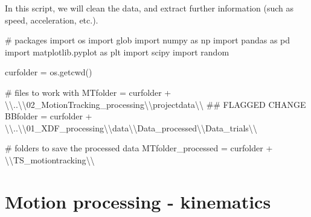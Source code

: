 \documentclass[
  letterpaper,
  DIV=11,
  numbers=noendperiod]{scrreprt}
\newenvironment{Shaded}{\begin{snugshade}}{\end{snugshade}}
\newcommand{\CharTok}[1]{\textcolor[rgb]{0.13,0.47,0.30}{#1}}
\newcommand{\CommentTok}[1]{\textcolor[rgb]{0.37,0.37,0.37}{#1}}
\newcommand{\ImportTok}[1]{\textcolor[rgb]{0.00,0.46,0.62}{#1}}
\newcommand{\NormalTok}[1]{\textcolor[rgb]{0.00,0.23,0.31}{#1}}
\newcommand{\OperatorTok}[1]{\textcolor[rgb]{0.37,0.37,0.37}{#1}}
\newcommand{\StringTok}[1]{\textcolor[rgb]{0.13,0.47,0.30}{#1}}
\begin{document}
In this script, we will clean the data, and extract further information
(such as speed, acceleration, etc.).

\begin{Shaded}
\begin{Highlighting}[]
\CommentTok{\# packages}
\ImportTok{import}\NormalTok{ os}
\ImportTok{import}\NormalTok{ glob}
\ImportTok{import}\NormalTok{ numpy }\ImportTok{as}\NormalTok{ np}
\ImportTok{import}\NormalTok{ pandas }\ImportTok{as}\NormalTok{ pd}
\ImportTok{import}\NormalTok{ matplotlib.pyplot }\ImportTok{as}\NormalTok{ plt}
\ImportTok{import}\NormalTok{ scipy}
\ImportTok{import}\NormalTok{ random}



\NormalTok{curfolder }\OperatorTok{=}\NormalTok{ os.getcwd()}

\CommentTok{\# files to work with}
\NormalTok{MTfolder }\OperatorTok{=}\NormalTok{ curfolder }\OperatorTok{+} \StringTok{\textquotesingle{}}\CharTok{\textbackslash{}\textbackslash{}}\StringTok{..}\CharTok{\textbackslash{}\textbackslash{}}\StringTok{02\_MotionTracking\_processing}\CharTok{\textbackslash{}\textbackslash{}}\StringTok{projectdata}\CharTok{\textbackslash{}\textbackslash{}}\StringTok{\textquotesingle{}} \CommentTok{\#\# FLAGGED CHANGE}
\NormalTok{BBfolder }\OperatorTok{=}\NormalTok{ curfolder }\OperatorTok{+} \StringTok{\textquotesingle{}}\CharTok{\textbackslash{}\textbackslash{}}\StringTok{..}\CharTok{\textbackslash{}\textbackslash{}}\StringTok{01\_XDF\_processing}\CharTok{\textbackslash{}\textbackslash{}}\StringTok{data}\CharTok{\textbackslash{}\textbackslash{}}\StringTok{Data\_processed}\CharTok{\textbackslash{}\textbackslash{}}\StringTok{Data\_trials}\CharTok{\textbackslash{}\textbackslash{}}\StringTok{\textquotesingle{}}

\CommentTok{\# folders to save the processed data}
\NormalTok{MTfolder\_processed }\OperatorTok{=}\NormalTok{ curfolder }\OperatorTok{+} \StringTok{\textquotesingle{}}\CharTok{\textbackslash{}\textbackslash{}}\StringTok{TS\_motiontracking}\CharTok{\textbackslash{}\textbackslash{}}\StringTok{\textquotesingle{}}
\end{Highlighting}
\end{Shaded}


\chapter{Motion processing -
kinematics}\label{motion-processing---kinematics}
\end{document}
